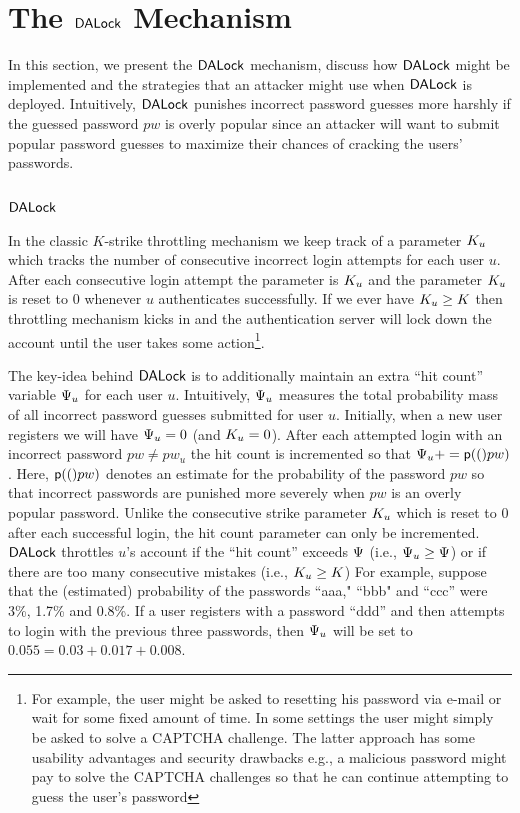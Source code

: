

\section{The $\mathsf{DALock}$ Mechanism}\label{sec:DALockAlgorithm} %
In this section, we present the $\mathsf{DALock}$ mechanism, discuss how $\mathsf{DALock}$ might be implemented and the strategies that an attacker might use when $\mathsf{DALock}$ is deployed. Intuitively, $\mathsf{DALock}$ punishes incorrect password guesses more harshly if the guessed password $pw$ is overly popular since an attacker will want to submit popular password guesses to maximize their chances of cracking the users' passwords.

\subsection{$\mathsf{DALock}$} %
In the classic $K$-strike throttling mechanism we keep track of a parameter $K_u$ which tracks the number of consecutive incorrect login attempts for each user $u$. After each consecutive login attempt the parameter is $K_u$ and the parameter $K_u$ is reset to $0$ whenever $u$ authenticates successfully. If we ever have $K_u \geq K$ then throttling mechanism kicks in and the authentication server will lock down the account until the user takes some action\footnote{For example, the user might be asked to  resetting his password via e-mail or wait for some fixed amount of time. In some settings the user might simply be asked to solve a CAPTCHA challenge. The latter approach has some usability advantages and security drawbacks e.g., a malicious password might pay to solve the CAPTCHA challenges so that he can continue attempting to guess the user's password}.

The key-idea behind $\mathsf{DALock}$ is to additionally maintain an extra ``hit count'' variable $\Psi_{u}$ for each user $u$. Intuitively, $\Psi_{u}$ measures the total probability mass of all incorrect password guesses submitted for user $u$. Initially, when a new user registers we will have $\Psi_{u}=0$ (and $K_u =0$). After each attempted login with an incorrect password $pw \neq pw_u$ the hit count is incremented so that $\Psi_{u}+= \textsf{p}(()pw)$. Here, $\textsf{p}(()pw)$ denotes an estimate for the probability of the password $pw$ so that incorrect passwords are punished more severely when $pw$ is an overly popular password. Unlike the consecutive strike parameter $K_u$ which is reset to $0$ after each successful login, the hit count parameter can only be incremented. $\mathsf{DALock}$ throttles $u$'s account if the ``hit count'' exceeds $\Psi$ (i.e., $\Psi_{u} \geq \Psi$) or if there are too many consecutive mistakes (i.e., $K_{u} \geq K$)  For example, suppose that the (estimated) probability of the passwords ``aaa," ``bbb" and ``ccc'' were 3\%, 1.7\% and 0.8\%. If a user registers with a password ``ddd'' and then attempts to login with the previous three passwords, then $\Psi_{u}$ will be set to $0.055=0.03+0.017+0.008$. 

